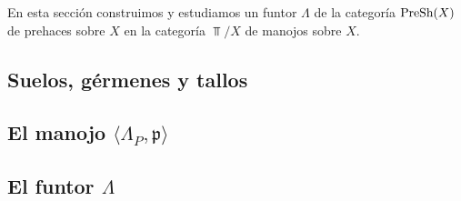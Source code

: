 En esta sección construimos y estudiamos un funtor $\Lambda$ de la categoría $\normalfont{\text{PreSh}}(X)$ de prehaces sobre $X$ en la categoría $\Top /X$ de manojos sobre $X$.
\subsection{Suelos, gérmenes y tallos}
   
\subsection{El manojo $\langle \Lambda_{P},\mathfrak{p} \rangle$}
   
\subsection{El funtor $\Lambda$}
   
